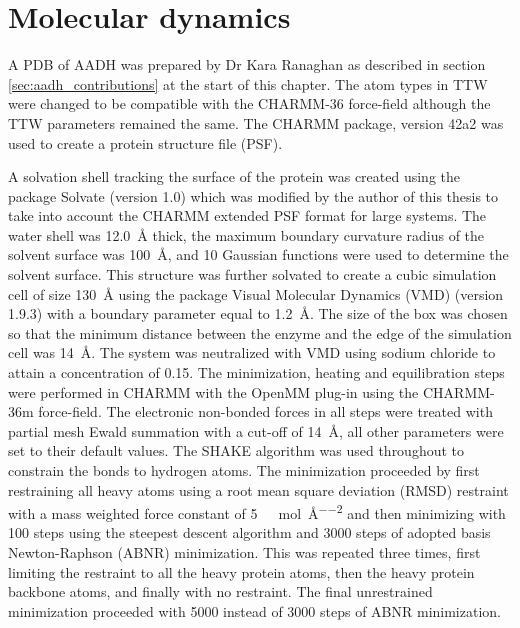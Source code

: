 \section{Molecular dynamics}\label{sec:aadh_md}

A PDB of AADH was prepared by Dr Kara Ranaghan as described in section \ref{sec:aadh_contributions} at the start of this chapter. The atom types in TTW were changed to be compatible with the CHARMM-36\cite{huangCHARMM36AllatomAdditive2013} force-field although the TTW parameters remained the same. The CHARMM package, version 42a2\cite{brooksCHARMMBiomolecularSimulation2009} was used to create a protein structure file (PSF). 

A solvation shell tracking the surface of the protein was created using the package Solvate (version 1.0)\cite{grubmullerSolvate} which was modified by the author of this thesis to take into account the CHARMM extended PSF format for large systems. The water shell was \SI{12.0}{\angstrom} thick, the maximum boundary curvature radius of the solvent surface was \SI{100}{\angstrom}, and \num{10} Gaussian functions were used to determine the solvent surface. This structure was further solvated to create a cubic simulation cell of size \SI{130}{\angstrom} using the package Visual Molecular Dynamics (VMD) (version 1.9.3)\cite{HUMP96} with a boundary parameter equal to \SI{1.2}{\angstrom}. The size of the box was chosen so that the minimum distance between the enzyme and the edge of the simulation cell was  \SI{14}{\angstrom}. The system was neutralized with VMD using sodium chloride to attain a concentration of \SI{0.15}{\molar}. 
The minimization, heating and equilibration steps were performed in CHARMM with the OpenMM\cite{OpenMMRapidDevelopment} plug-in using the CHARMM-36m\cite{huangCHARMM36AllatomAdditive2013} force-field. The electronic non-bonded forces in all steps were treated with partial mesh Ewald summation\cite{dardenParticleMeshEwald1993} with a cut-off of \SI{14}{\angstrom}, all other parameters were set to their default values. The SHAKE\cite{ryckaertNumericalIntegrationCartesian1977b} algorithm was used throughout to constrain the bonds to hydrogen atoms. The minimization proceeded by first restraining all heavy atoms  using a root mean square deviation (RMSD) restraint with a mass weighted force constant of \SI{5}{\kilo\cal\per\mol\per\square\angstrom} and then minimizing with \num{100} steps using the steepest descent algorithm and \num{3000} steps of adopted basis Newton-Raphson (ABNR) minimization. This was repeated three times, first limiting the  restraint to all the heavy protein atoms, then the heavy protein backbone atoms, and finally with no restraint. The final unrestrained minimization proceeded with \num{5000} instead of \num{3000} steps of ABNR minimization. 

